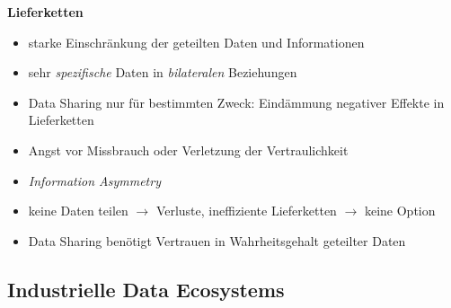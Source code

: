 \vspace{1cm}

\textbf{Lieferketten}
\begin{itemize}
    \item starke Einschränkung der geteilten Daten und Informationen
    \item sehr \emph{spezifische} Daten in \emph{bilateralen} Beziehungen
    \item Data Sharing nur für bestimmten Zweck: Eindämmung negativer Effekte in Lieferketten
    \item Angst vor Missbrauch oder Verletzung der Vertraulichkeit
    \item \emph{Information Asymmetry}
    \item keine Daten teilen $\to$ Verluste, ineffiziente Lieferketten $\to$ keine Option
    \item Data Sharing benötigt Vertrauen in Wahrheitsgehalt geteilter Daten~\cite{mollerIndustrialDataEcosystems2024}
\end{itemize}


\subsection{Industrielle Data Ecosystems}

